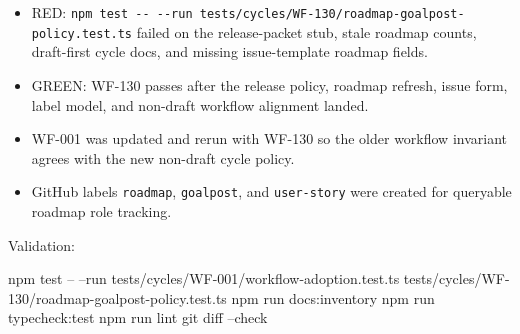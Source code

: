 \begin{itemize}
\tightlist
\item
  RED: \texttt{n\allowbreak{}p\allowbreak{}m\allowbreak{} \allowbreak{}t\allowbreak{}e\allowbreak{}s\allowbreak{}t\allowbreak{} \allowbreak{}-\allowbreak{}-\allowbreak{} \allowbreak{}-\allowbreak{}-\allowbreak{}r\allowbreak{}u\allowbreak{}n\allowbreak{} \allowbreak{}t\allowbreak{}e\allowbreak{}s\allowbreak{}t\allowbreak{}s\allowbreak{}/\allowbreak{}c\allowbreak{}y\allowbreak{}c\allowbreak{}l\allowbreak{}e\allowbreak{}s\allowbreak{}/\allowbreak{}W\allowbreak{}F\allowbreak{}-\allowbreak{}1\allowbreak{}3\allowbreak{}0\allowbreak{}/\allowbreak{}r\allowbreak{}o\allowbreak{}a\allowbreak{}d\allowbreak{}m\allowbreak{}a\allowbreak{}p\allowbreak{}-\allowbreak{}g\allowbreak{}o\allowbreak{}a\allowbreak{}l\allowbreak{}p\allowbreak{}o\allowbreak{}s\allowbreak{}t\allowbreak{}-\allowbreak{}p\allowbreak{}o\allowbreak{}l\allowbreak{}i\allowbreak{}c\allowbreak{}y\allowbreak{}.\allowbreak{}t\allowbreak{}e\allowbreak{}s\allowbreak{}t\allowbreak{}.\allowbreak{}t\allowbreak{}s} failed on the release-packet stub, stale roadmap counts, draft-first cycle docs, and missing issue-template roadmap fields.
\item
  GREEN: WF-130 passes after the release policy, roadmap refresh, issue form, label model, and non-draft workflow alignment landed.
\item
  WF-001 was updated and rerun with WF-130 so the older workflow invariant agrees with the new non-draft cycle policy.
\item
  GitHub labels \texttt{r\allowbreak{}o\allowbreak{}a\allowbreak{}d\allowbreak{}m\allowbreak{}a\allowbreak{}p}, \texttt{g\allowbreak{}o\allowbreak{}a\allowbreak{}l\allowbreak{}p\allowbreak{}o\allowbreak{}s\allowbreak{}t}, and \texttt{u\allowbreak{}s\allowbreak{}e\allowbreak{}r\allowbreak{}-\allowbreak{}s\allowbreak{}t\allowbreak{}o\allowbreak{}r\allowbreak{}y} were created for queryable roadmap role tracking.
\end{itemize}

Validation:

\begin{CodeBlock}
npm test -- --run tests/cycles/WF-001/workflow-adoption.test.ts tests/cycles/WF-130/roadmap-goalpost-policy.test.ts
npm run docs:inventory
npm run typecheck:test
npm run lint
git diff --check
\end{CodeBlock}

